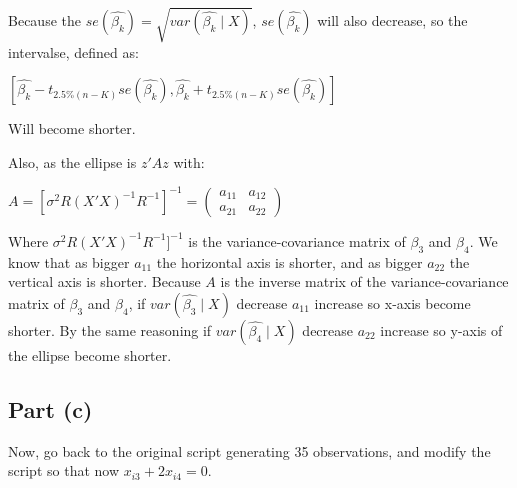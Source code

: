 \documentclass[12pt,a4paper]{article}
\begin{document}
\begin{enumerate}[label=(\roman*)]
Because the $se(\hat{\beta_k}) = \sqrt{var(\hat{\beta_k}\mid X)}$, $se(\hat{\beta_k})$ will also decrease, so the intervalse, defined as:

\begin{center}
   $[\hat{\beta_k} - t_{2.5\%(n-K)} se(\hat{\beta_k}), \hat{\beta_k} + t_{2.5\%(n-K)} se(\hat{\beta_k})]$ 
\end{center}

Will become shorter.

Also, as the ellipse is $z'Az $ with:

\begin{center}
    $A = [\sigma^2R(X'X)^{-1}R^{-1}]^{-1} =
\begin{pmatrix}
a_{11} & a_{12}\\
a_{21} & a_{22}
\end{pmatrix}
$
\end{center}

Where $\sigma^2R(X'X)^{-1}R^{-1}]^{-1}$ is the variance-covariance matrix of $\beta_3$ and $\beta_4$. We know that as bigger $a_{11}$ the horizontal axis is shorter, and as bigger $a_{22}$ the vertical axis is shorter. Because $A$ is the inverse matrix of the variance-covariance matrix of $\beta_3$ and $\beta_4$, if $var(\hat{\beta_3}\mid X)$ decrease $a_{11}$ increase so x-axis become shorter. By the same reasoning if $var(\hat{\beta_4}\mid X)$ decrease $a_{22}$ increase so y-axis of the ellipse become shorter.

  
\end{enumerate}

\subsection*{Part (c)}
Now, go back to the original script generating 35 observations, and modify the script so that now $x_{i3} + 2x_{i4} = 0$.
\end{document}
